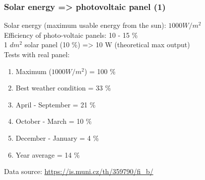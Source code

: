 \documentclass[12;pt,t]{beamer} %
\newcommand{\srctext}[1]{{\fontsize{7}{9}\selectfont\textcolor{sourcesclr}{#1}}}
\begin{document}
\begin{frame}
    \frametitle{Solar energy => photovoltaic panel (1)}
    Solar energy (maximum usable energy from the sun): $1000 W/m^2$\\
    Efficiency of photo-voltaic panels: 10 - 15 \%\\ 
    
   \vspace{5mm}
    1 $dm^2$ solar panel (10 \%) => 10 W (theoretical max output)\\
    
    Tests with real panel:
    \begin{center}
   		\begin{enumerate} %
   			\item Maximum ($1000 W/m^2$) = 100 \%
  			\item Best weather condition =  33 \%
   			\item April - September = 21 \%
   			\item October - March = 10 \%
  			\item December - January = 4 \%
            \item Year average = 14 \%
   		\end{enumerate}
    \end{center}
    \srctext{Data source: \url{https://is.muni.cz/th/359790/fi_b/}}
\end{frame}
\end{document}
